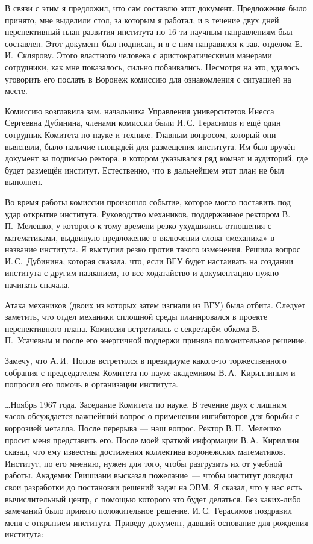 В связи с этим я предложил, что сам составлю этот документ. Предложение было принято, мне выделили стол, за которым я работал, и в течение двух
дней перспективный план развития института по 16-ти научным направлениям был составлен. Этот документ был подписан, и я с ним направился к зав. отделом Е.\,И.~Склярову. Этого властного человека с аристократическими манерами сотрудники, как мне показалось, сильно побаивались. Несмотря на это, удалось уговорить его послать в Воронеж комиссию для ознакомления с ситуацией на месте.

Комиссию возглавила зам. начальника Управления университетов Инесса Сергеевна Дубинина, членами комиссии были И.\,С.~Герасимов и ещё один сотрудник Комитета по науке и технике. Главным вопросом, который они выясняли, было наличие площадей для размещения института. Им был вручён документ за подписью ректора, в котором указывался ряд комнат и аудиторий, где будет размещён институт. Естественно, что в дальнейшем этот план не был выполнен.

Во время работы комиссии произошло событие, которое могло поставить под удар открытие института.
Руководство механиков, поддержанное ректором В.\,П.~Мелешко,
у которого к тому времени резко ухудшились отношения с математиками,
выдвинуло предложение о включении слова «механика» в название института.
Я выступил резко против такого изменения.
Решила вопрос И.\,С.~Дубинина, которая сказала, что, если ВГУ будет настаивать на создании института с другим названием,
то все ходатайство и документацию нужно начинать сначала.

Атака механиков (двоих из которых затем изгнали из ВГУ) была отбита.
Следует заметить, что отдел механики сплошной среды планировался в проекте перспективного плана.
Комиссия встретилась с секретарём обкома В.\,П.~Усачевым и после его энергичной поддержи приняла положительное решение.

Замечу, что А.\,И.~Попов встретился в президиуме какого-то торжественного собрания
с председателем Комитета по науке академиком В.\,А.~Кириллиным и попросил его помочь в организации института.

\ldots Ноябрь 1967 года. Заседание Комитета по науке.
В течение двух с лишним часов обсуждается важнейший вопрос о применении ингибиторов для борьбы с коррозией металла.
После перерыва --- наш вопрос. Ректор В.\,П.~Мелешко просит меня представить его.
После моей краткой информации В.\,А.~Кириллин сказал, что ему известны достижения коллектива воронежских математиков.
Институт, по его мнению, нужен для того, чтобы разгрузить их от учебной работы.
Академик Гвишиани высказал пожелание~--- чтобы институт доводил свои разработки до постановки решений задач на ЭВМ.
Я сказал, что у нас есть вычислительный центр, с помощью которого это будет делаться.
Без каких-либо замечаний было принято положительное решение.
И.\,С.~Герасимов поздравил меня с открытием института. Приведу документ, давший основание для рождения института:


